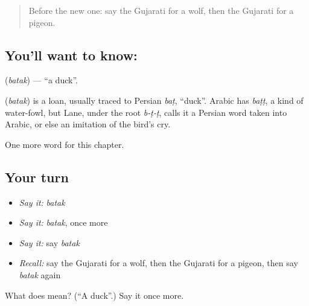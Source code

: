 \begin{quote}
Before the new one: say the Gujarati for a wolf, then the Gujarati for a pigeon.
\end{quote}

\subsection*{You'll want to know: }
\textbf{} (\emph{batak}) — \textquotedblleft{}a duck\textquotedblright{}.

\begin{cousinweb}
\textbf{} (\emph{batak}) is a loan, usually traced to Persian \emph{baṭ}, \textquotedblleft{}duck\textquotedblright{}. Arabic has \emph{baṭṭ}, a kind of water-fowl, but Lane, under the root \emph{b-ṭ-ṭ}, calls it a Persian word taken into Arabic, or else an imitation of the bird's cry.
\end{cousinweb}

\begin{grammarlens}[title={What you've built}]
One more word for this chapter.
\end{grammarlens}

\subsection*{Your turn}
\begin{itemize}
\raggedright
  \item \emph{Say it:} \emph{batak}
  \item \emph{Say it:} \emph{batak}, once more
  \item \emph{Say it:} say \emph{batak}
  \item \emph{Recall:} say the Gujarati for a wolf, then the Gujarati for a pigeon, then say \emph{batak} again
\end{itemize}

\begin{tcolorbox}[breakable,colback=teal!4,colframe=teal!35!black,title={Before you move on}]
What does  mean? (\textquotedblleft{}A duck\textquotedblright{}.) Say it once more.
\end{tcolorbox}
